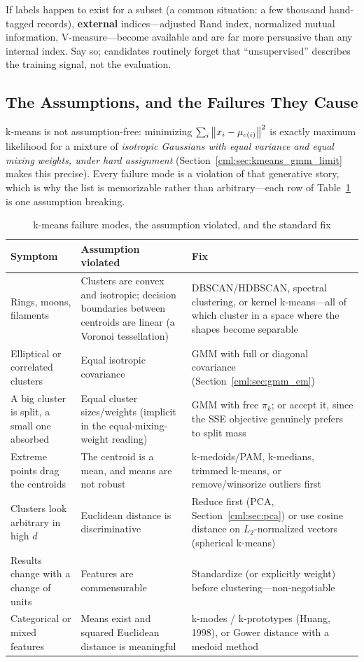 If labels happen to exist for a subset (a common situation: a few thousand hand-tagged records), \textbf{external} indices---adjusted Rand index, normalized mutual information, V-measure---become available and are far more persuasive than any internal index. Say so; candidates routinely forget that ``unsupervised'' describes the training signal, not the evaluation.

\subsection{The Assumptions, and the Failures They Cause}

k-means is not assumption-free: minimizing $\sum_i \left\lVert x_i - \mu_{c(i)}\right\rVert^2$ is exactly maximum likelihood for a mixture of \emph{isotropic Gaussians with equal variance and equal mixing weights, under hard assignment} (Section~\ref{cml:sec:kmeans_gmm_limit} makes this precise). Every failure mode is a violation of that generative story, which is why the list is memorizable rather than arbitrary---each row of Table~\ref{cml:tab:kmeans_failures} is one assumption breaking.

\begin{table}[H]
\centering
\small
\caption{k-means failure modes, the assumption violated, and the standard fix}
\label{cml:tab:kmeans_failures}
\begin{tabularx}{\textwidth}{@{}l X X@{}}
\toprule
\textbf{Symptom} & \textbf{Assumption violated} & \textbf{Fix} \\
\midrule
Rings, moons, filaments & Clusters are convex and isotropic; decision boundaries between centroids are linear (a Voronoi tessellation) & DBSCAN/HDBSCAN, spectral clustering, or kernel k-means---all of which cluster in a space where the shapes become separable \\
Elliptical or correlated clusters & Equal isotropic covariance & GMM with full or diagonal covariance (Section~\ref{cml:sec:gmm_em}) \\
A big cluster is split, a small one absorbed & Equal cluster sizes/weights (implicit in the equal-mixing-weight reading) & GMM with free $\pi_k$; or accept it, since the SSE objective genuinely prefers to split mass \\
Extreme points drag the centroids & The centroid is a mean, and means are not robust & k-medoids/PAM, k-medians, trimmed k-means, or remove/winsorize outliers first \\
Clusters look arbitrary in high $d$ & Euclidean distance is discriminative & Reduce first (PCA, Section~\ref{cml:sec:pca}) or use cosine distance on $L_2$-normalized vectors (spherical k-means) \\
Results change with a change of units & Features are commensurable & Standardize (or explicitly weight) before clustering---non-negotiable \\
Categorical or mixed features & Means exist and squared Euclidean distance is meaningful & k-modes / k-prototypes (Huang, 1998), or Gower distance with a medoid method \\
\bottomrule
\end{tabularx}
\end{table}

